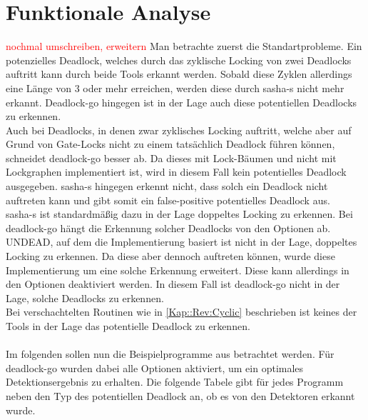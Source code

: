 \section{Funktionale Analyse}
\textcolor{red}{nochmal umschreiben, erweitern}
Man betrachte zuerst die Standartprobleme. Ein potenzielles Deadlock, welches 
durch das zyklische Locking von zwei Deadlocks auftritt kann durch beide Tools
erkannt werden. Sobald diese Zyklen allerdings eine Länge von 3 oder mehr 
erreichen, werden diese durch sasha-s nicht mehr erkannt. Deadlock-go 
hingegen ist in der Lage auch diese potentiellen Deadlocks zu erkennen.\\
Auch bei Deadlocks, in denen zwar zyklisches Locking auftritt, welche aber 
auf Grund von Gate-Locks nicht zu einem tatsächlich Deadlock führen können,
schneidet deadlock-go besser ab. Da dieses mit Lock-Bäumen und nicht mit 
Lockgraphen implementiert ist, wird in diesem Fall kein potentielles Deadlock 
ausgegeben. sasha-s hingegen erkennt nicht, dass solch ein Deadlock nicht 
auftreten kann und gibt somit ein false-positive potentielles Deadlock aus.\\ 
sasha-s ist standardmäßig dazu in  der Lage doppeltes Locking zu erkennen.
Bei deadlock-go hängt die Erkennung solcher Deadlocks von den Optionen ab.
UNDEAD, auf dem die Implementierung basiert ist nicht in der Lage, doppeltes 
Locking zu erkennen. Da diese aber dennoch auftreten können, wurde diese 
Implementierung um eine solche Erkennung erweitert. Diese kann allerdings 
in den Optionen deaktiviert werden. In diesem Fall ist deadlock-go nicht in 
der Lage, solche Deadlocks zu erkennen. \\ 
Bei verschachtelten Routinen wie in \ref{Kap::Rev:Cyclic} beschrieben ist 
keines der Tools in der Lage das potentielle Deadlock zu erkennen.\\\\ 
Im folgenden sollen nun die Beispielprogramme aus \cite{implementation} 
betrachtet werden. Für deadlock-go wurden dabei alle Optionen aktiviert, um ein 
optimales Detektionsergebnis zu erhalten.
Die folgende Tabele gibt für jedes Programm neben den
Typ des potentiellen Deadlock an, ob es von den Detektoren erkannt wurde. 
